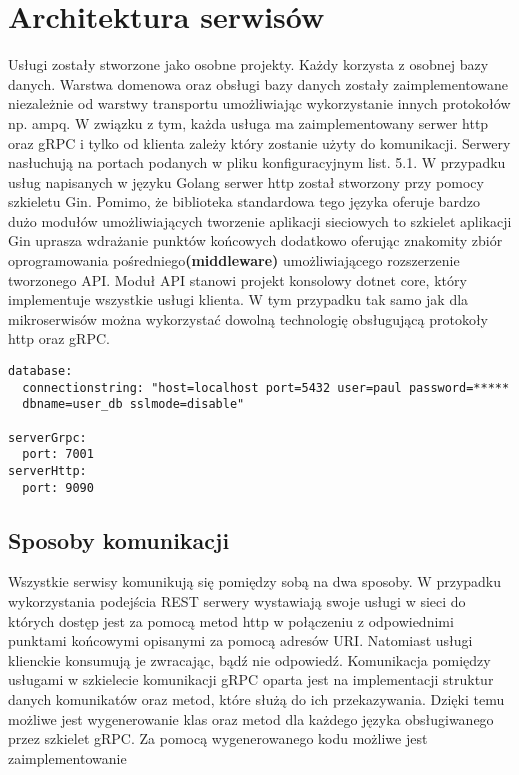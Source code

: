 \section{Architektura serwisów}
\par Usługi zostały stworzone jako osobne projekty. Każdy korzysta z osobnej bazy danych. Warstwa domenowa oraz obsługi bazy danych zostały zaimplementowane niezależnie od warstwy transportu umożliwiając wykorzystanie innych protokołów np. ampq. W związku z tym, każda usługa ma zaimplementowany serwer http oraz gRPC i tylko od klienta zależy który zostanie użyty do komunikacji. Serwery nasłuchują na portach podanych w pliku konfiguracyjnym list. 5.1. W przypadku usług napisanych w języku Golang serwer http został stworzony przy pomocy szkieletu Gin. Pomimo, że biblioteka standardowa tego języka oferuje bardzo dużo modułów umożliwiających tworzenie aplikacji sieciowych to szkielet aplikacji Gin uprasza wdrażanie punktów końcowych dodatkowo oferując znakomity zbiór oprogramowania pośredniego\textbf{(middleware)} umożliwiającego rozszerzenie tworzonego API. Moduł API stanowi projekt konsolowy dotnet core, który implementuje wszystkie usługi klienta. W tym przypadku tak samo jak dla mikroserwisów można wykorzystać dowolną technologię obsługującą protokoły http oraz gRPC.
\begin{lstlisting}[columns=fullflexible,  caption=Przykład konfiguracji usługi]
database:
  connectionstring: "host=localhost port=5432 user=paul password=***** 
  dbname=user_db sslmode=disable"

serverGrpc:
  port: 7001
serverHttp:
  port: 9090
\end{lstlisting}
\subsection{Sposoby komunikacji}
\par Wszystkie serwisy komunikują się pomiędzy sobą na dwa sposoby. W przypadku wykorzystania podejścia REST serwery wystawiają swoje usługi w sieci do których dostęp jest za pomocą metod http w połączeniu z odpowiednimi punktami końcowymi opisanymi za pomocą adresów URI. Natomiast usługi klienckie konsumują je zwracając, bądź nie odpowiedź.
Komunikacja pomiędzy usługami w szkielecie komunikacji gRPC oparta jest na implementacji struktur danych komunikatów oraz metod, które służą do ich przekazywania. Dzięki temu możliwe jest wygenerowanie klas oraz metod dla każdego języka obsługiwanego przez szkielet gRPC. Za pomocą wygenerowanego kodu możliwe jest zaimplementowanie
